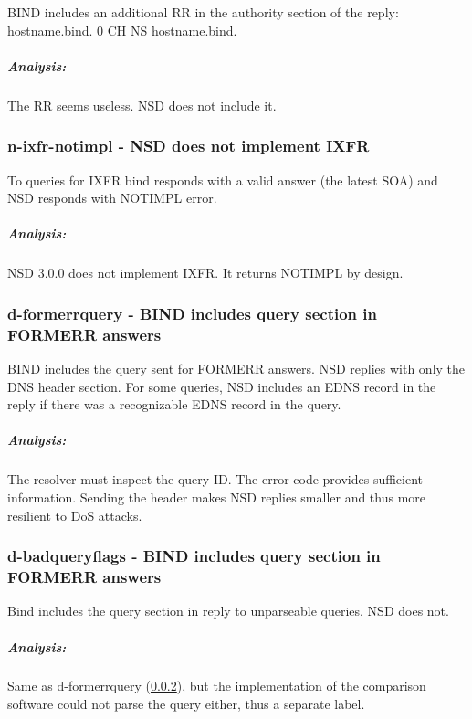 \documentclass[twoside,titlepage,english]{nlnetlabs}
\begin{document}
BIND includes an additional RR in the authority section of the reply:
hostname.bind. 0 CH NS hostname.bind.

\vspace{-8pt}\subparagraph{Analysis:}

The RR seems useless. NSD does not include it.


\subsubsection{n-ixfr-notimpl - NSD does not implement IXFR}
\label{n-ixfr-notimpl}

To queries for IXFR bind responds with a valid answer (the latest SOA)
and NSD responds with NOTIMPL error.

\vspace{-8pt}\subparagraph{Analysis:}

NSD 3.0.0 does not implement IXFR. It returns NOTIMPL by design.


\subsubsection{d-formerrquery - BIND includes query section in FORMERR answers}
\label{d-formerrquery}

BIND includes the query sent for FORMERR answers. NSD replies with only
the DNS header section. For some queries, NSD includes an EDNS record in 
the reply if there was a recognizable EDNS record in the query.

\vspace{-8pt}\subparagraph{Analysis:}

The resolver must inspect the query ID. The error code provides sufficient
information. Sending the header makes NSD replies smaller and thus more 
resilient to DoS attacks.


\subsubsection{d-badqueryflags - BIND includes query section in FORMERR answers}
\label{d-badqueryflags}

Bind includes the query section in reply to unparseable queries. NSD does not.

\vspace{-8pt}\subparagraph{Analysis:}

Same as d-formerrquery (\ref{d-formerrquery}), but the implementation of the comparison 
software could not parse the query either, thus a separate label.
\end{document}
